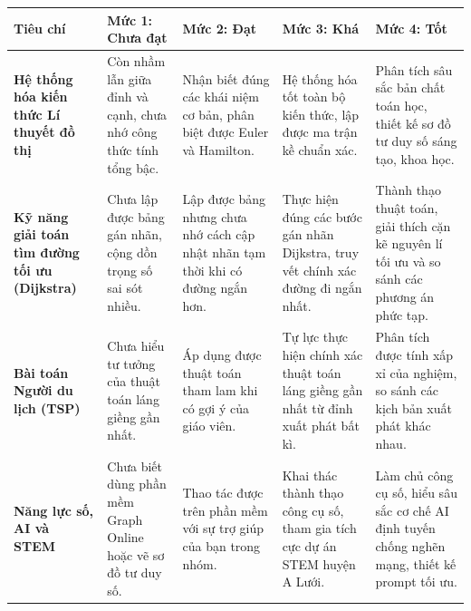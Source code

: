 \documentclass[12pt, a4paper]{article}
\begin{document}
\begin{center}
\begin{tabularx}{\textwidth}{|>{\bfseries}p{3cm}|X|X|X|X|}
\hline
\textbf{Tiêu chí} & \textbf{Mức 1: Chưa đạt} & \textbf{Mức 2: Đạt} & \textbf{Mức 3: Khá} & \textbf{Mức 4: Tốt} \\ \hline
Hệ thống hóa kiến thức Lí thuyết đồ thị & Còn nhầm lẫn giữa đỉnh và cạnh, chưa nhớ công thức tính tổng bậc. & Nhận biết đúng các khái niệm cơ bản, phân biệt được Euler và Hamilton. & Hệ thống hóa tốt toàn bộ kiến thức, lập được ma trận kề chuẩn xác. & Phân tích sâu sắc bản chất toán học, thiết kế sơ đồ tư duy số sáng tạo, khoa học. \\ \hline
Kỹ năng giải toán tìm đường tối ưu (Dijkstra) & Chưa lập được bảng gán nhãn, cộng dồn trọng số sai sót nhiều. & Lập được bảng nhưng chưa nhớ cách cập nhật nhãn tạm thời khi có đường ngắn hơn. & Thực hiện đúng các bước gán nhãn Dijkstra, truy vết chính xác đường đi ngắn nhất. & Thành thạo thuật toán, giải thích cặn kẽ nguyên lí tối ưu và so sánh các phương án phức tạp. \\ \hline
Bài toán Người du lịch (TSP) & Chưa hiểu tư tưởng của thuật toán láng giềng gần nhất. & Áp dụng được thuật toán tham lam khi có gợi ý của giáo viên. & Tự lực thực hiện chính xác thuật toán láng giềng gần nhất từ đỉnh xuất phát bất kì. & Phân tích được tính xấp xỉ của nghiệm, so sánh các kịch bản xuất phát khác nhau. \\ \hline
Năng lực số, AI và STEM & Chưa biết dùng phần mềm Graph Online hoặc vẽ sơ đồ tư duy số. & Thao tác được trên phần mềm với sự trợ giúp của bạn trong nhóm. & Khai thác thành thạo công cụ số, tham gia tích cực dự án STEM huyện A Lưới. & Làm chủ công cụ số, hiểu sâu sắc cơ chế AI định tuyến chống nghẽn mạng, thiết kế prompt tối ưu. \\ \hline
\end{tabularx}
\end{center}
\end{document}
